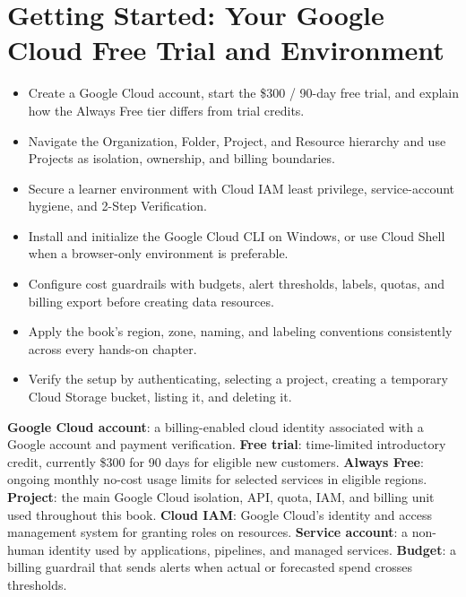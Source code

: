 \chapter{Getting Started: Your Google Cloud Free Trial and Environment}

\begin{objectives}
\begin{itemize}
    \item Create a Google Cloud account, start the \$300 / 90-day free trial, and explain how the Always Free tier differs from trial credits.
    \item Navigate the Organization, Folder, Project, and Resource hierarchy and use Projects as isolation, ownership, and billing boundaries.
    \item Secure a learner environment with Cloud IAM least privilege, service-account hygiene, and 2-Step Verification.
    \item Install and initialize the Google Cloud CLI on Windows, or use Cloud Shell when a browser-only environment is preferable.
    \item Configure cost guardrails with budgets, alert thresholds, labels, quotas, and billing export before creating data resources.
    \item Apply the book's region, zone, naming, and labeling conventions consistently across every hands-on chapter.
    \item Verify the setup by authenticating, selecting a project, creating a temporary Cloud Storage bucket, listing it, and deleting it.
\end{itemize}
\end{objectives}


\begin{keyterms}
\textbf{Google Cloud account}: a billing-enabled cloud identity associated with a Google account and payment verification.
\textbf{Free trial}: time-limited introductory credit, currently \$300 for 90 days for eligible new customers.
\textbf{Always Free}: ongoing monthly no-cost usage limits for selected services in eligible regions.
\textbf{Project}: the main Google Cloud isolation, API, quota, IAM, and billing unit used throughout this book.
\textbf{Cloud IAM}: Google Cloud's identity and access management system for granting roles on resources.
\textbf{Service account}: a non-human identity used by applications, pipelines, and managed services.
\textbf{Budget}: a billing guardrail that sends alerts when actual or forecasted spend crosses thresholds.
\end{keyterms}

